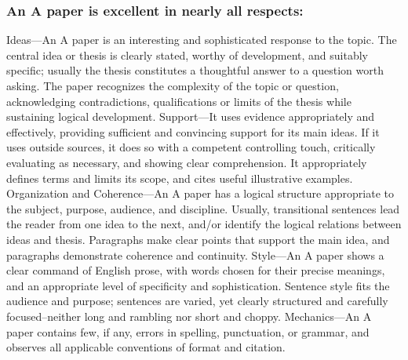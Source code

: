 \documentclass{article}
\begin{document}
\subsubsection{An A paper is excellent in nearly all respects:}
Ideas---An A paper is an interesting and sophisticated response to the topic. The central idea or thesis is clearly stated, worthy of development, and suitably specific; usually the thesis constitutes a thoughtful answer to a question worth asking. The paper recognizes the complexity of the topic or question, acknowledging contradictions, qualifications or limits of the thesis while sustaining logical development. Support---It uses evidence appropriately and effectively, providing sufficient and convincing support for its main ideas. If it uses outside sources, it does so with a competent controlling touch, critically evaluating as necessary, and showing clear comprehension. It appropriately defines terms and limits its scope, and cites useful illustrative examples. Organization and Coherence---An A paper has a logical structure appropriate to the subject, purpose, audience, and discipline. Usually, transitional sentences lead the reader from one idea to the next, and/or identify the logical relations between ideas and thesis. Paragraphs make clear points that support the main idea, and paragraphs demonstrate coherence and continuity. Style---An A paper shows a clear command of English prose, with words chosen for their precise meanings, and an appropriate level of specificity and sophistication. Sentence style fits the audience and purpose; sentences are varied, yet clearly structured and carefully focused--neither long and rambling nor short and choppy. Mechanics---An A paper contains few, if any, errors in spelling, punctuation, or grammar, and observes all applicable conventions of format and citation.
\end{document}

